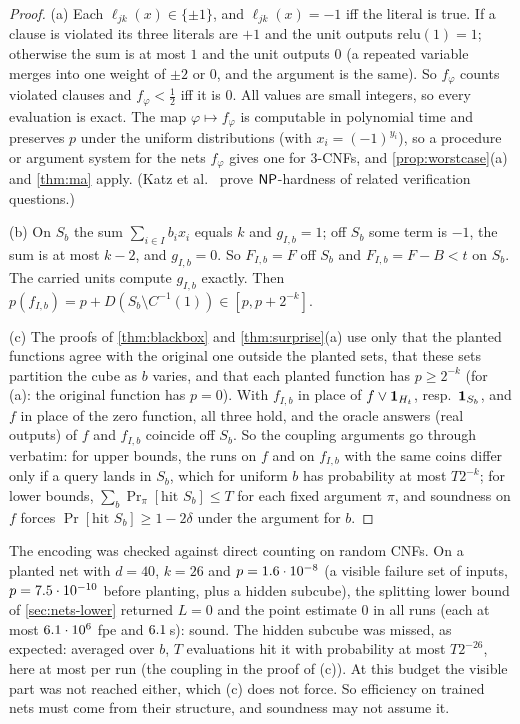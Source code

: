 \begin{proof}
(a) Each $\ell_{jk}(x)\in\{\pm1\}$, and $\ell_{jk}(x)=-1$ iff the literal is true. If a
clause is violated its three literals are $+1$ and the unit outputs
$\mathrm{relu}(1)=1$; otherwise the sum is at most $1$ and the unit outputs $0$ (a
repeated variable merges into one weight of $\pm2$ or $0$, and the argument is the
same). So $f_\varphi$ counts violated clauses and $f_\varphi<\frac12$ iff it is $0$.
All values are small integers, so every evaluation is exact. The map $\varphi\mapsto
f_\varphi$ is computable in polynomial time and preserves $p$ under the uniform
distributions (with $x_i=(-1)^{y_i}$), so a procedure or argument system for the nets
$f_\varphi$ gives one for 3-CNFs, and \cref{prop:worstcase}(a) and \cref{thm:ma} apply.
(Katz et al.~\cite{katz2017reluplex} prove $\mathsf{NP}$-hardness of related verification
questions.)

(b) On $S_b$ the sum $\sum_{i\in I}b_ix_i$ equals $k$ and $g_{I,b}=1$; off $S_b$ some term
is $-1$, the sum is at most $k-2$, and $g_{I,b}=0$. So $F_{I,b}=F$ off $S_b$ and
$F_{I,b}=F-B<t$ on $S_b$. The carried units compute $g_{I,b}$ exactly. Then
$p(f_{I,b})=p+D(S_b\setminus C^{-1}(1))\in[p,p+2^{-k}]$.

(c) The proofs of \cref{thm:blackbox} and \cref{thm:surprise}(a) use only that the
planted functions agree with the original one outside the planted sets, that these
sets partition the cube as $b$ varies, and that each planted function has $p\ge2^{-k}$
(for (a): the original function has $p=0$). With $f_{I,b}$ in place of $f\vee\mathbf{1}_{H_t}$,
resp.\ $\mathbf{1}_{S_b}$, and $f$ in place of the zero function, all three hold, and the
oracle answers (real outputs) of $f$ and $f_{I,b}$ coincide off $S_b$. So the coupling
arguments go through verbatim: for upper bounds, the runs on $f$ and on $f_{I,b}$ with
the same coins differ only if a query lands in $S_b$, which for uniform $b$ has
probability at most $T2^{-k}$; for lower bounds, $\sum_b\Pr_\pi[\text{hit }S_b]\le T$ for
each fixed argument $\pi$, and soundness on $f$ forces $\Pr[\text{hit }S_b]\ge1-2\delta$
under the argument for $b$.
\end{proof}

The encoding was checked against direct counting on \nnCnfTrials{} random CNFs. On a
planted net with $d=40$, $k=26$ and $p=1.6\cdot10^{-8}$ (a visible failure set of
\nnPlantedVisF{} inputs, $p=7.5\cdot10^{-10}$ before planting, plus a hidden subcube),
the splitting lower bound of \cref{sec:nets-lower} returned $L=0$ and the point
estimate $0$ in all \nnPlantedRuns{} runs (each at most $6.1\cdot10^{6}$ fpe and
$6.1$\,s): sound. The hidden subcube was missed, as expected: averaged over
$b$, $T$ evaluations hit it with probability at most $T2^{-26}$, here at most
\nnPlantedHit{} per run (the coupling in the proof of (c)). At this budget the visible
part was not reached either, which (c) does not force. So efficiency on trained nets must come from their
structure, and soundness may not assume it.


